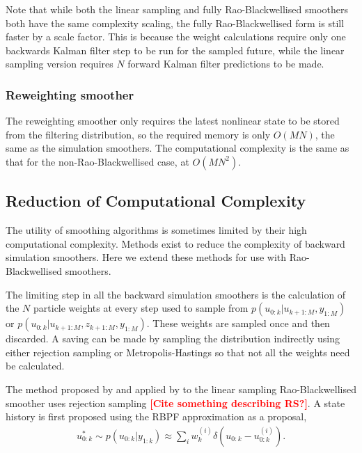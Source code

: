 \documentclass[twocolumn]{autart}    %
\newcommand{\comment}[1]{\textcolor{red}{\textbf{[#1]}}}
\begin{document}
Note that while both the linear sampling and fully Rao-Blackwellised smoothers both have the same complexity scaling, the fully Rao-Blackwellised form is still faster by a scale factor. This is because the weight calculations require only one backwards Kalman filter step to be run for the sampled future, while the linear sampling version requires $N$ forward Kalman filter predictions to be made.

\subsubsection{Reweighting smoother}

The reweighting smoother only requires the latest nonlinear state to be stored from the filtering distribution, so the required memory is only $O(MN)$, the same as the simulation smoothers. The computational complexity is the same as that for the non-Rao-Blackwellised case, at $O(MN^2)$.



\subsection{Reduction of Computational Complexity}

The utility of smoothing algorithms is sometimes limited by their high computational complexity. Methods exist to reduce the complexity of backward simulation smoothers. Here we extend these methods for use with Rao-Blackwellised smoothers.

The limiting step in all the backward simulation smoothers is the calculation of the $N$ particle weights at every step used to sample from $p(u_{0:k}|u_{k+1:M}, y_{1:M})$ or $p(u_{0:k}|u_{k+1:M}, z_{k+1:M}, y_{1:M})$. These weights are sampled once and then discarded. A saving can be made by sampling the distribution indirectly using either rejection sampling or Metropolis-Hastings so that not all the weights need be calculated.

The method proposed by \cite{Douc+Garivier+Moulines+Olsson:2010} and applied by \cite{Lindsten+Schon:2011} to the linear sampling Rao-Blackwellised smoother uses rejection sampling \comment{Cite something describing RS?}. A state history is first proposed using the RBPF approximation as a proposal,
%
\begin{equation}
\begin{split}
  u_{0:k}^* \sim p(u_{0:k} | y_{1:k}) \approx \sum_i w_k^{(i)} \delta( u_{0:k} - u_{0:k}^{(i)} )     .
\end{split}
\end{equation}
\end{document}
